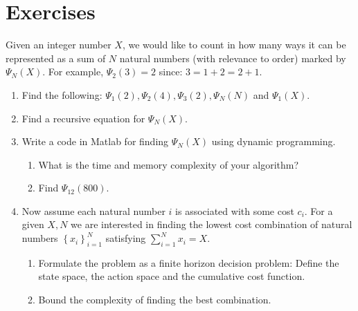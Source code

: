 \section{Exercises}
\begin{exercise}
Given an integer number $X$, we would like to count in how many ways it can be represented as a sum of $N$ natural numbers (with relevance to order) marked by ${\Psi _N}\left( X \right)$. For example, ${\Psi _2}\left( 3 \right) = 2$ since: $3 = 1 + 2 = 2 + 1$.
\begin{enumerate}
  \item Find the following: ${\Psi _1}\left( 2 \right),{\Psi _2}\left( 4 \right),{\Psi _3}\left( 2 \right),{\Psi _N}\left( N \right)$ and ${\Psi _1}\left( X \right)$.
  \item Find a recursive equation for ${\Psi _N}\left( X \right)$.
  \item Write a code in Matlab for finding ${\Psi _N}\left( X \right)$ using dynamic programming.
  \begin{enumerate}
    \item What is the time and memory complexity of your algorithm?
    \item Find ${\Psi _{12}}\left( {800} \right)$.
  \end{enumerate}
  \item Now assume each natural number $i$ is associated with some cost ${c_i}$. For a given $X,N$ we are interested in finding the lowest cost combination of natural numbers $\left\{ {{x_i}} \right\}_{i = 1}^N$ satisfying $\sum\nolimits_{i = 1}^N {{x_i}}  = X$.
      \begin{enumerate}
        \item Formulate the problem as a finite horizon decision problem: Define the state space, the action space and the cumulative cost function.
        \item Bound the complexity of finding the best combination.
      \end{enumerate}
\end{enumerate}
\end{exercise}

